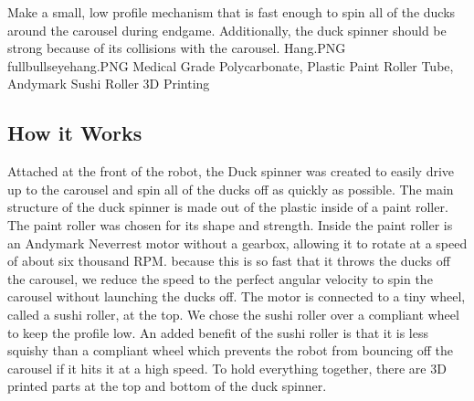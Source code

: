 {Make a small, low profile mechanism that is fast enough to spin all of the ducks around the carousel during endgame. Additionally, the duck spinner should be strong because of its collisions with the carousel.} %
{Hang.PNG}%
{fullbullseyehang.PNG}%
{Medical Grade Polycarbonate, Plastic Paint Roller Tube, Andymark Sushi Roller}%
{3D Printing}%


\subsection*{How it Works}
Attached at the front of the robot, the Duck spinner was created to easily drive up to the carousel and spin all of the ducks off as quickly as possible. The main structure of the duck spinner is made out of the plastic inside of a paint roller. The paint roller was chosen for its shape and strength. Inside the paint roller is an Andymark Neverrest motor without a gearbox, allowing it to rotate at a speed of about six thousand RPM. because this is so fast that it throws the ducks off the carousel, we reduce the speed to the perfect angular velocity to spin the carousel without launching the ducks off. The motor is connected to a tiny wheel, called a sushi roller, at the top. We chose the sushi roller over a compliant wheel to keep the profile low. An added benefit of the sushi roller is that it is less squishy than a compliant wheel which prevents the robot from bouncing off the carousel if it hits it at a high speed. To hold everything together, there are 3D printed parts at the top and bottom of the duck spinner.



